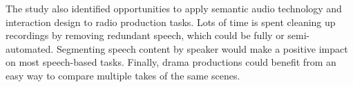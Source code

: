 The study also identified opportunities to apply semantic audio technology and interaction design to radio production
tasks. Lots of time is spent cleaning up recordings by removing redundant speech, which could be fully or
semi-automated. Segmenting speech content by speaker would make a positive impact on most speech-based tasks. Finally,
drama productions could benefit from an easy way to compare multiple takes of the same scenes.
